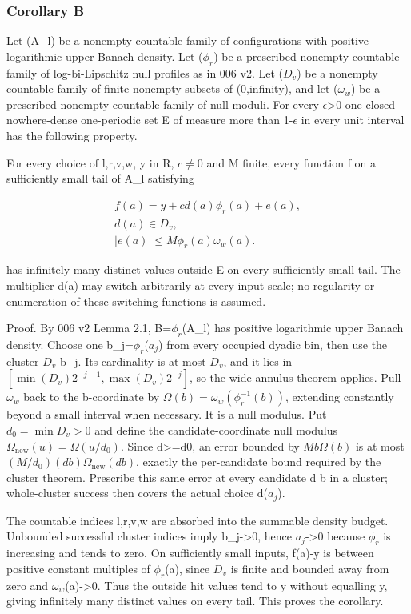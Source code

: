 \documentclass[
  11pt,
]{article}
\theoremstyle{remark}\newtheorem{remark}[theorem]{Remark}
\begin{document}
\subsubsection{Corollary B}\label{corollary-b}

Let (A\_l) be a nonempty countable family of configurations with
positive logarithmic upper Banach density. Let (\(\phi_r\)) be a
prescribed nonempty countable family of log-bi-Lipschitz null profiles
as in 006 v2. Let (\(D_v\)) be a nonempty countable family of finite
nonempty subsets of (0,infinity), and let (\(\omega_w\)) be a prescribed
nonempty countable family of null moduli. For every
\(\epsilon\)\textgreater0 one closed nowhere-dense one-periodic set E of
measure more than 1-\(\epsilon\) in every unit interval has the
following property.

For every choice of l,r,v,w, y in R, \(c\ne0\) and M finite, every
function f on a sufficiently small tail of A\_l satisfying

\[
\begin{gathered}f(a)=y+cd(a)\phi_r(a)+e(a),\\ d(a)\in D_v,\\ |e(a)|\le M\phi_r(a)\omega_w(a).\end{gathered}\tag{B.1}
\]

has infinitely many distinct values outside E on every sufficiently
small tail. The multiplier d(a) may switch arbitrarily at every input
scale; no regularity or enumeration of these switching functions is
assumed.

Proof. By 006 v2 Lemma 2.1, B=\(\phi_r\)(A\_l) has positive logarithmic
upper Banach density. Choose one b\_j=\(\phi_r\)(\(a_j\)) from every
occupied dyadic bin, then use the cluster \(D_v\) b\_j. Its cardinality
is at most \textbar{}\(D_v\)\textbar, and it lies in
\([\min(D_v)2^{-j-1},\max(D_v)2^{-j}]\), so the wide-annulus theorem
applies. Pull \(\omega_w\) back to the b-coordinate by
\(\Omega(b)=\omega_w(\phi_r^{-1}(b))\), extending constantly beyond a
small interval when necessary. It is a null modulus. Put
\(d_0=\min D_v>0\) and define the candidate-coordinate null modulus
\(\Omega_{\mathrm{new}}(u)=\Omega(u/d_0)\). Since d\textgreater=d0, an
error bounded by \(Mb\Omega(b)\) is at most
\((M/d_0)(db)\Omega_{\mathrm{new}}(db)\), exactly the per-candidate
bound required by the cluster theorem. Prescribe this same error at
every candidate d b in a cluster; whole-cluster success then covers the
actual choice d(\(a_j\)).

The countable indices l,r,v,w are absorbed into the summable density
budget. Unbounded successful cluster indices imply b\_j-\textgreater0,
hence \(a_j\)-\textgreater0 because \(\phi_r\) is increasing and tends
to zero. On sufficiently small inputs, \textbar f(a)-y\textbar{} is
between positive constant multiples of \(\phi_r\)(a), since \(D_v\) is
finite and bounded away from zero and \(\omega_w\)(a)-\textgreater0.
Thus the outside hit values tend to y without equalling y, giving
infinitely many distinct values on every tail. This proves the
corollary.
\end{document}
